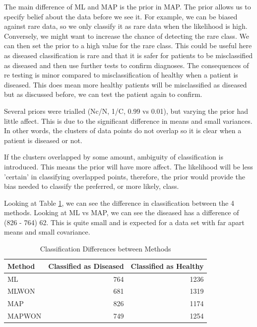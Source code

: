{{The main difference of ML and MAP is the prior in MAP. The prior allows us to specify belief about the data before we see it. For example, we can be biased against rare data, so we only classify it as rare data when the likelihood is high. Conversely, we might want to increase the chance of detecting the rare class. We can then set the prior to a high value for the rare class. This could be useful here as diseased classification is rare and that it is safer for patients to be misclassified as diseased and then use further tests to confirm diagnoses. The consequences of re testing is minor compared to misclassification of healthy when a patient is diseased. This does mean more healthy patients will be misclassified as diseased but as discussed before, we can test the patient again to confirm. 

Several priors were trialled (Nc/N, 1/C, 0.99 vs 0.01), but varying the prior had little affect. This is due to the significant difference in means and small variances. In other words, the clusters of data points do not overlap so it is clear when a patient is diseased or not. 

If the clusters overlapped by some amount, ambiguity of classification is introduced. This means the prior will have more affect. The likelihood will be less 'certain' in classifying overlapped points, therefore, the prior would provide the bias needed to classify the preferred, or more likely, class.

Looking at Table \ref{t:classNumber}, we can see the difference in classification between the 4 methods. Looking at ML vs MAP, we can see the diseased has a difference of (826 - 764) 62. This is quite small and is expected for a data set with far apart means and small covariance. 



\begin{table}[h]
	\centering
	\caption{Classification Differences between Methods}
	\label{t:classNumber}
	\begin{tabular}{lrr}
		\hline
		\textbf{Method} & \textbf{Classified as Diseased} & \textbf{Classified as Healthy}\\ \hline
		ML & 764 & 1236 \\
		MLWON& 681 & 1319 \\
		MAP & 826 & 1174  \\
		MAPWON & 749 & 1254 \\
	\end{tabular}
\end{table}

}}
